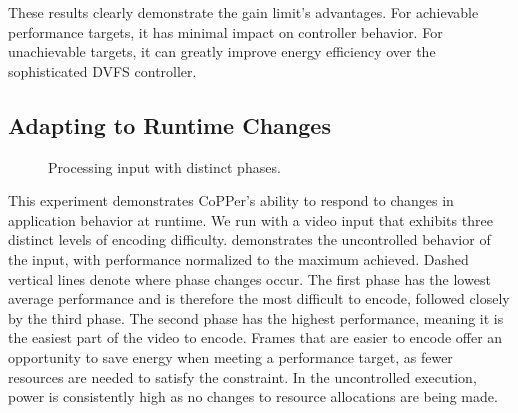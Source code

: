 
These results clearly demonstrate the gain limit's advantages.
For achievable performance targets, it has minimal impact on controller behavior.
For unachievable targets, it can greatly improve energy efficiency over the sophisticated DVFS controller.


\subsection{Adapting to Runtime Changes}
\label{sec:copper-eval-runtime}

\begin{figure}[t]
  \centering
  \newline
  \caption{Processing  input with distinct phases.}
  \label{fig:copper-phases}
\end{figure}

This experiment demonstrates CoPPer's ability to respond to changes in application behavior at runtime.
We run  with a video input that exhibits three distinct levels of encoding difficulty.
 demonstrates the uncontrolled behavior of the input, with performance normalized to the maximum achieved.
Dashed vertical lines denote where phase changes occur.
The first phase has the lowest average performance and is therefore the most difficult to encode, followed closely by the third phase.
The second phase has the highest performance, meaning it is the easiest part of the video to encode.
Frames that are easier to encode offer an opportunity to save energy when meeting a performance target, as fewer resources are needed to satisfy the constraint.
In the uncontrolled execution, power is consistently high as no changes to resource allocations are being made.

